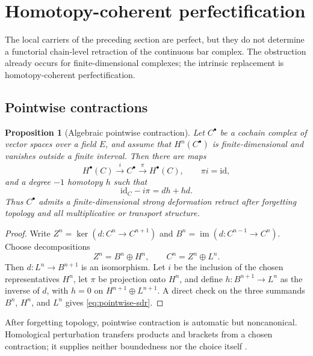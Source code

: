 \documentclass[11pt]{article}
\newtheorem{proposition}[theorem]{Proposition}
\theoremstyle{definition}
\begin{document}
\section{Homotopy-coherent perfectification}\label{sec:strict-no-go}

The local carriers of the preceding section are perfect, but they do not determine a functorial chain-level retraction of the continuous bar complex.  The obstruction already occurs for finite-dimensional complexes; the intrinsic replacement is homotopy-coherent perfectification.

\subsection{Pointwise contractions}

\begin{proposition}[Algebraic pointwise contraction]\label{prop:pointwise-contraction}
Let $C^\bullet$ be a cochain complex of vector spaces over a field $E$, and assume that $H^n(C^\bullet)$ is finite-dimensional and vanishes outside a finite interval.  Then there are maps
\[
H^\bullet(C)\xrightarrow{\ i\ }C^\bullet
\xrightarrow{\ \pi\ }H^\bullet(C),
\qquad
\pi i=\mathrm{id},
\]
and a degree $-1$ homotopy $h$ such that
\begin{equation}\label{eq:pointwise-sdr}
\mathrm{id}_{C}-i\pi=dh+hd.
\end{equation}
Thus $C^\bullet$ admits a finite-dimensional strong deformation retract after forgetting topology and all multiplicative or transport structure.
\end{proposition}

\begin{proof}
Write $Z^n=\ker(d:C^n\to C^{n+1})$ and $B^n=\operatorname{im}(d:C^{n-1}\to C^n)$.  Choose decompositions
\[
Z^n=B^n\oplus H^n,
\qquad
C^n=Z^n\oplus L^n.
\]
Then $d:L^n\to B^{n+1}$ is an isomorphism.  Let $i$ be the inclusion of the chosen representatives $H^n$, let $\pi$ be projection onto $H^n$, and define $h:B^{n+1}\to L^n$ as the inverse of $d$, with $h=0$ on $H^{n+1}\oplus L^{n+1}$.  A direct check on the three summands $B^n$, $H^n$, and $L^n$ gives \eqref{eq:pointwise-sdr}.
\end{proof}

After forgetting topology, pointwise contraction is automatic but noncanonical.  Homological perturbation transfers products and brackets from a chosen contraction; it supplies neither boundedness nor the choice itself \cite{ManettiPerturbation,VokrinekHPT}.
\end{document}
